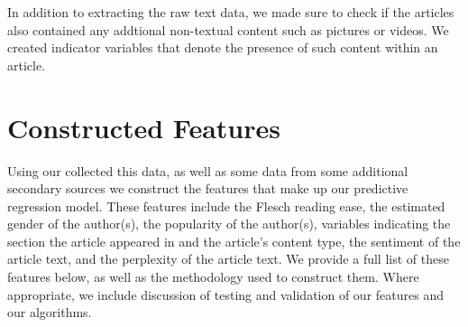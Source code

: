 \documentclass[fleqn,12pt]{SelfArx} %
\begin{document}
In addition to extracting the raw text data, we made sure to check if the articles also contained any addtional non-textual content such as pictures or videos. We created indicator variables that denote the presence of such content within an article.



\section{Constructed Features}

Using our collected this data, as well as some data from some additional secondary sources we construct the features that make up our predictive regression model. These features include the Flesch reading ease, the estimated gender of the author(s), the popularity of the author(s), variables indicating the section the article appeared in and the article's content type, the sentiment of the article text, and the perplexity of the article text. We provide a full list of these features below, as well as the methodology used to construct them. Where appropriate, we include discussion of testing and validation of our features and our algorithms.
\end{document}
